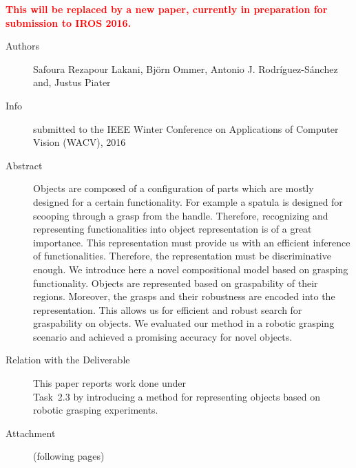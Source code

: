 \documentclass[a4paper,11pt,pdf]{pacmanreport}
\begin{document}
\textbf{\textcolor{red}{This will be replaced by a new paper,
    currently in preparation for submission to IROS 2016.}}

\begin{description}
\item[Authors] Safoura Rezapour Lakani, Bj\"{o}rn Ommer, Antonio
  J. Rodr\'{i}guez-S\'{a}nchez and, Justus Piater
\item[Info] submitted to the IEEE Winter Conference on Applications of
  Computer Vision (WACV), 2016
\item[Abstract] Objects are composed of a configuration of parts which
  are mostly designed for a certain functionality. For example a
  spatula is designed for scooping through a grasp from the
  handle. Therefore, recognizing and representing functionalities into
  object representation is of a great importance. This representation
  must provide us with an efficient inference of
  functionalities. Therefore, the representation must be
  discriminative enough. We introduce here a novel compositional model
  based on grasping functionality. Objects are represented based on
  graspability of their regions. Moreover, the grasps and their
  robustness are encoded into the representation. This allows us for
  efficient and robust search for graspability on objects. We
  evaluated our method in a robotic grasping scenario and achieved a
  promising accuracy for novel objects.
\item[Relation with the Deliverable]\hfill This paper reports work
  done under\\ Task~2.3 by introducing a method for representing
  objects based on robotic grasping experiments.
\item[Attachment] (following pages)
\end{description}


\end{document}
